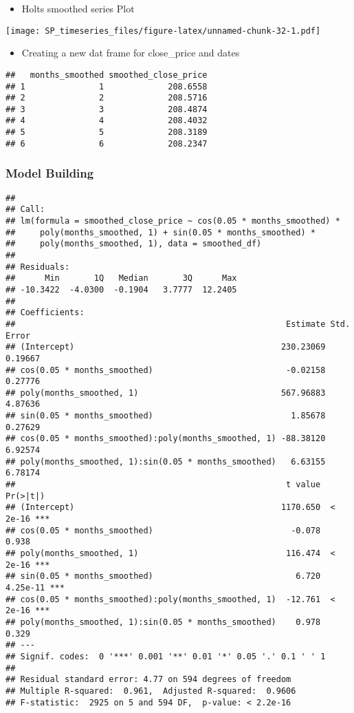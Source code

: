 \documentclass[]{article}
\providecommand{\tightlist}{%
  \setlength{\itemsep}{0pt}\setlength{\parskip}{0pt}}
\begin{document}
\begin{itemize}
\tightlist
\item
  Holts smoothed series Plot
\end{itemize}

\texttt{[image: SP\_timeseries\_files/figure-latex/unnamed-chunk-32-1.pdf]}

\begin{itemize}
\tightlist
\item
  Creating a new dat frame for close\_price and dates
\end{itemize}

\begin{verbatim}
##   months_smoothed smoothed_close_price
## 1               1             208.6558
## 2               2             208.5716
## 3               3             208.4874
## 4               4             208.4032
## 5               5             208.3189
## 6               6             208.2347
\end{verbatim}

\subsubsection{Model Building}\label{model-building}

\begin{verbatim}
## 
## Call:
## lm(formula = smoothed_close_price ~ cos(0.05 * months_smoothed) * 
##     poly(months_smoothed, 1) + sin(0.05 * months_smoothed) * 
##     poly(months_smoothed, 1), data = smoothed_df)
## 
## Residuals:
##      Min       1Q   Median       3Q      Max 
## -10.3422  -4.0300  -0.1904   3.7777  12.2405 
## 
## Coefficients:
##                                                       Estimate Std. Error
## (Intercept)                                          230.23069    0.19667
## cos(0.05 * months_smoothed)                           -0.02158    0.27776
## poly(months_smoothed, 1)                             567.96883    4.87636
## sin(0.05 * months_smoothed)                            1.85678    0.27629
## cos(0.05 * months_smoothed):poly(months_smoothed, 1) -88.38120    6.92574
## poly(months_smoothed, 1):sin(0.05 * months_smoothed)   6.63155    6.78174
##                                                       t value Pr(>|t|)    
## (Intercept)                                          1170.650  < 2e-16 ***
## cos(0.05 * months_smoothed)                            -0.078    0.938    
## poly(months_smoothed, 1)                              116.474  < 2e-16 ***
## sin(0.05 * months_smoothed)                             6.720 4.25e-11 ***
## cos(0.05 * months_smoothed):poly(months_smoothed, 1)  -12.761  < 2e-16 ***
## poly(months_smoothed, 1):sin(0.05 * months_smoothed)    0.978    0.329    
## ---
## Signif. codes:  0 '***' 0.001 '**' 0.01 '*' 0.05 '.' 0.1 ' ' 1
## 
## Residual standard error: 4.77 on 594 degrees of freedom
## Multiple R-squared:  0.961,  Adjusted R-squared:  0.9606 
## F-statistic:  2925 on 5 and 594 DF,  p-value: < 2.2e-16
\end{verbatim}
\end{document}
